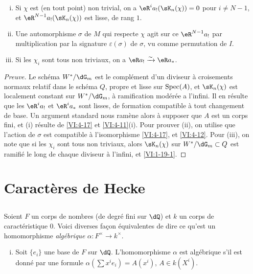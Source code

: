\begin{proposition_}\label{VI:4-20}
\begin{enumerate}[(i)]
  \item Si $\chi$ est (en tout point) non trivial, on a 
    $\eR^i a_! (\sK_n(\chi)) = 0$ pour $i\ne N-1$, et 
    $\eR^{N-1} a_!(\sK_n(\chi))$ est lisse, de rang $1$. 
  \item Une automorphisme $\sigma$ de $M$ qui respecte $\chi$ agit sur ce 
    $\eR^{N-1} a_!$ par multiplication par la signature $\varepsilon(\sigma)$ 
    de $\sigma$, vu comme permutation de $I$. 
  \item Si les $\chi_i$ sont tous non triviaux, on a $\eR a_! \iso \eR a_\ast$. 
\end{enumerate}
\end{proposition_}
\begin{proof}[Preuve]
Le schéma $W^\ast/\dG_m$ est le complément d'un diviseur à croisements 
normaux relatif dans le schéma $Q$, propre et lisse sur $\operatorname{Spec}(A)$, et 
$\sK_n(\chi)$ est localement constant sur $W^\ast/\dG_m$, à ramification 
modérée a l'infini. Il en résulte que les $\eR^i a_!$ et 
$\eR^i a_\ast$ sont lisses, de formation compatible à tout changement de 
base. Un argument standard nous ramène alors à supposer que $A$ est un 
corps fini, et (i) résulte de \ref{VI:4-17} et \ref{VI:4-11}(i). Pour 
prouver (ii), on utilise que l'action de $\sigma$ est compatible à 
l'isomorphisme \ref{VI:4-17}, et \ref{VI:4-12}. Pour (iii), on note que si les 
$\chi_i$ sont tous non triviaux, alors $\sK_n(\chi)$ sur 
$W^\ast/\dG_m\subset Q$ est ramifié le long de chaque diviseur à l'infini, 
et \ref{VI:1-19-1}. 
\end{proof}










\section{Caractères de Hecke}\label{VI:5}





\subsection{}\label{VI:5-1}

Soient $F$ un corps de nombres (de degré fini sur $\dQ$) et $k$ un corps de 
caractéristique $0$. Voici diverses façon équivalentes de dire ce qu'est un 
homomorphisme \emph{algébrique} $\alpha:F^\times \to k^\times$. 
\begin{enumerate}[(i)]
  \item Soit $\{e_i\}$ une base de $F$ sur $\dQ$. L'homomorphisme $\alpha$ est 
    algébrique s'il est donné par une formule 
    $\alpha(\sum x^i e_i) = A(x^i)$, $A\in k(X^i)$. 
\end{enumerate}

